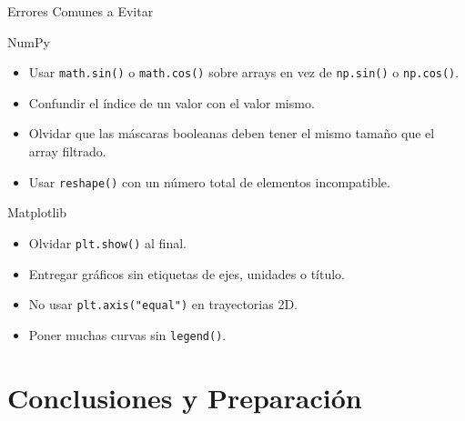 \documentclass[10pt]{beamer}
\begin{document}
\begin{frame}[shrink=8]{Errores Comunes a Evitar}
  \begin{block}{NumPy}
    \begin{itemize}
      \item Usar \texttt{math.sin()} o \texttt{math.cos()} sobre arrays en vez de \texttt{np.sin()} o \texttt{np.cos()}.
      \item Confundir el índice de un valor con el valor mismo.
      \item Olvidar que las máscaras booleanas deben tener el mismo tamaño que el array filtrado.
      \item Usar \texttt{reshape()} con un número total de elementos incompatible.
    \end{itemize}
  \end{block}

  \begin{block}{Matplotlib}
    \begin{itemize}
      \item Olvidar \texttt{plt.show()} al final.
      \item Entregar gráficos sin etiquetas de ejes, unidades o título.
      \item No usar \texttt{plt.axis("equal")} en trayectorias 2D.
      \item Poner muchas curvas sin \texttt{legend()}.
    \end{itemize}
  \end{block}
\end{frame}

\section{Conclusiones y Preparación}
\end{document}
